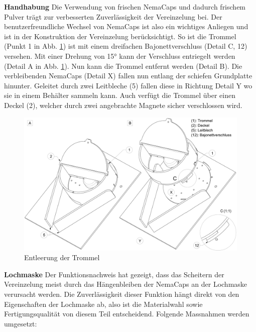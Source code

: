 \textbf{Handhabung}
\newline
Die Verwendung von frischen NemaCaps und dadurch frischem Pulver trägt zur verbesserten Zuverlässigkeit der Vereinzelung bei. Der benutzerfreundliche Wechsel von NemaCaps ist also ein wichtiges Anliegen und ist in der Konstruktion der Vereinzelung berücksichtigt. So ist die Trommel (Punkt 1 in Abb. \ref{fig:vereinzelung_entleeren}) ist mit einem dreifachen Bajonettverschluss (Detail C, 12) versehen. Mit einer Drehung von 15° kann der Verschluss entriegelt werden (Detail A in Abb. \ref{fig:vereinzelung_entleeren}). Nun kann die Trommel entfernt werden (Detail B). Die verbleibenden NemaCaps (Detail X) fallen nun entlang der schiefen Grundplatte hinunter. Geleitet durch zwei Leitbleche (5) fallen diese in Richtung Detail Y wo sie in einem Behälter sammeln kann. Auch verfügt die Trommel über einen Deckel (2), welcher durch zwei angebrachte Magnete sicher verschlossen wird.
	\begin{figure}[H]
	\includegraphics[scale=0.42]{Illustrationen/6-Umsetzung/vereinzelung_entleeren.jpg}
	\caption{Entleerung der Trommel}
	\label{fig:vereinzelung_entleeren}
	\end{figure}
\textbf{Lochmaske}
\newline
Der Funktionsnachweis hat gezeigt, dass das Scheitern der Vereinzelung meist durch das Hängenbleiben der NemaCaps an der Lochmaske verursacht werden. Die Zuverlässigkeit dieser Funktion hängt direkt von den Eigenschaften der Lochmaske ab, also ist die Materialwahl sowie Fertigungsqualität von diesem Teil entscheidend. 
\newline
Folgende Massnahmen werden umgesetzt:
